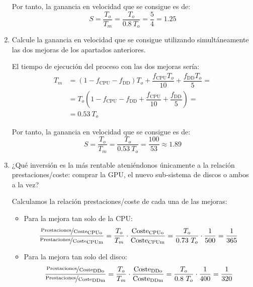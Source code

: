 \begin{ejercicio}
\begin{enumerate}
    Por tanto, la ganancia en velocidad que se consigue es de:
    \begin{equation*}
        S = \dfrac{T_o}{T_m} = \dfrac{T_o}{0.8\ T_o} = \dfrac{5}{4} = 1.25
    \end{equation*}
    \item Calcule la ganancia en velocidad que se consigue utilizando simultáneamente las dos mejoras de los apartados anteriores.
    
    El tiempo de ejecución del proceso con las dos mejoras sería:
    \begin{align*}
        T_m &= (1-f_{\text{CPU}}-f_{\text{DD}})T_o + \dfrac{f_{\text{CPU}}T_o}{10} + \dfrac{f_{\text{DD}}T_o}{5}
        =\\&= T_o\left(1-f_{\text{CPU}}-f_{\text{DD}}+\dfrac{f_{\text{CPU}}}{10}+\dfrac{f_{\text{DD}}}{5}\right)
        =\\&= 0.53\ T_o
    \end{align*}

    Por tanto, la ganancia en velocidad que se consigue es de:
    \begin{equation*}
        S = \dfrac{T_o}{T_m} = \dfrac{T_o}{0.53\ T_o} = \dfrac{100}{53} \approx 1.89
    \end{equation*}
    
    \item ¿Qué inversión es la más rentable ateniéndonos únicamente a la relación prestaciones/coste: comprar la GPU, el nuevo sub-sistema de discos o ambos a la vez?
    
    Calculamos la relación prestaciones/coste de cada una de las mejoras:
    \begin{itemize}
        \item Para la mejora tan solo de la CPU:
        \begin{equation*}
            \dfrac{\nicefrac{\text{Prestaciones}}{\text{Coste}}_{\text{CPUo}}}{\nicefrac{\text{Prestaciones}}{\text{Coste}}_{\text{CPUm}}} = \dfrac{T_o}{T_m}\cdot \dfrac{\text{Coste}_{\text{CPUo}}}{\text{Coste}_{\text{CPUm}}}
            = \dfrac{T_o}{0.73\ T_o}\cdot \dfrac{1}{500} = \dfrac{1}{365}
        \end{equation*}

        \item Para la mejora tan solo del disco:
        \begin{equation*}
            \dfrac{\nicefrac{\text{Prestaciones}}{\text{Coste}}_{\text{DDo}}}{\nicefrac{\text{Prestaciones}}{\text{Coste}}_{\text{DDm}}} = \dfrac{T_o}{T_m}\cdot \dfrac{\text{Coste}_{\text{DDo}}}{\text{Coste}_{\text{DDm}}}
            = \dfrac{T_o}{0.8\ T_o}\cdot \dfrac{1}{400} = \dfrac{1}{320}
        \end{equation*}


\end{itemize}
\end{enumerate}
\end{ejercicio}

